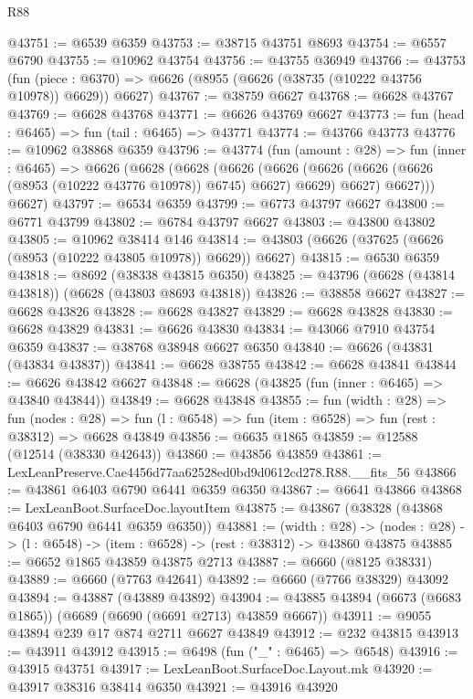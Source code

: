 \begin{lexlean}{R88}
\begin{coremodule}
@43751 := @6539 @6359
@43753 := @38715 @43751 @8693
@43754 := @6557 @6790
@43755 := @10962 @43754
@43756 := @43755 @36949
@43766 := @43753
    (fun (piece : @6370) => @6626 (@8955 (@6626 (@38735 (@10222 @43756 @10978)) @6629)) @6627)
@43767 := @38759 @6627
@43768 := @6628 @43767
@43769 := @6628 @43768
@43771 := @6626 @43769 @6627
@43773 := fun (head : @6465) => fun (tail : @6465) => @43771
@43774 := @43766 @43773
@43776 := @10962 @38868 @6359
@43796 := @43774
    (fun (amount : @28) =>
    fun (inner : @6465) =>
    @6626
      (@6628
        (@6628
          (@6626
            (@6626 (@6626 (@6626 (@6626 (@8953 (@10222 @43776 @10978)) @6745) @6627) @6629) @6627)
            @6627)))
      @6627)
@43797 := @6534 @6359
@43799 := @6773 @43797 @6627
@43800 := @6771 @43799
@43802 := @6784 @43797 @6627
@43803 := @43800 @43802
@43805 := @10962 @38414 @146
@43814 := @43803 (@6626 (@37625 (@6626 (@8953 (@10222 @43805 @10978)) @6629)) @6627)
@43815 := @6530 @6359
@43818 := @8692 (@38338 @43815 @6350)
@43825 := @43796 (@6628 (@43814 @43818)) (@6628 (@43803 @8693 @43818))
@43826 := @38858 @6627
@43827 := @6628 @43826
@43828 := @6628 @43827
@43829 := @6628 @43828
@43830 := @6628 @43829
@43831 := @6626 @43830
@43834 := @43066 @7910 @43754 @6359
@43837 := @38768 @38948 @6627 @6350
@43840 := @6626 (@43831 (@43834 @43837))
@43841 := @6628 @38755
@43842 := @6628 @43841
@43844 := @6626 @43842 @6627
@43848 := @6628 (@43825 (fun (inner : @6465) => @43840 @43844))
@43849 := @6628 @43848
@43855 := fun (width : @28) =>
  fun (nodes : @28) => fun (l : @6548) => fun (item : @6528) => fun (rest : @38312) => @6628 @43849
@43856 := @6635 @1865
@43859 := @12588 (@12514 (@38330 @42643))
@43860 := @43856 @43859
@43861 := LexLeanPreserve.Cae4456d77aa62528ed0bd9d0612cd278.R88.__fits_56
@43866 := @43861 @6403 @6790 @6441 @6359 @6350
@43867 := @6641 @43866
@43868 := LexLeanBoot.SurfaceDoc.layoutItem
@43875 := @43867 (@38328 (@43868 @6403 @6790 @6441 @6359 @6350))
@43881 := (width : @28) ->
  (nodes : @28) -> (l : @6548) -> (item : @6528) -> (rest : @38312) -> @43860 @43875
@43885 := @6652 @1865 @43859 @43875 @2713
@43887 := @6660 (@8125 @38331)
@43889 := @6660 (@7763 @42641)
@43892 := @6660 (@7766 @38329) @43092
@43894 := @43887 (@43889 @43892)
@43904 := @43885 @43894 (@6673 (@6683 @1865)) (@6689 (@6690 (@6691 @2713) @43859 @6667))
@43911 := @9055 @43894 @239 @17 @874 @2711 @6627 @43849
@43912 := @232 @43815
@43913 := @43911 @43912
@43915 := @6498 (fun ("_" : @6465) => @6548)
@43916 := @43915 @43751
@43917 := LexLeanBoot.SurfaceDoc.Layout.mk
@43920 := @43917 @38316 @38414 @6350
@43921 := @43916 @43920

\end{coremodule}
\end{lexlean}
